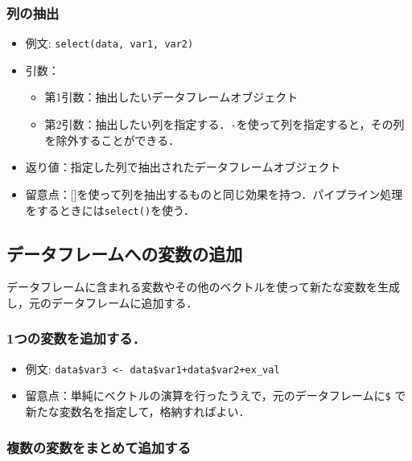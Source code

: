 \documentclass[
  xelatex, ja=standard]{bxjsarticle}
\providecommand{\tightlist}{%
  \setlength{\itemsep}{0pt}\setlength{\parskip}{0pt}}
\begin{document}
\subsubsection{列の抽出}\label{ux5217ux306eux62bdux51fa}

\begin{itemize}
\tightlist
\item
  例文: \texttt{select(data,\ var1,\ var2)}
\item
  引数：

  \begin{itemize}
  \tightlist
  \item
    第1引数：抽出したいデータフレームオブジェクト
  \item
    第2引数：抽出したい列を指定する．\texttt{-}を使って列を指定すると，その列を除外することができる．
  \end{itemize}
\item
  返り値：指定した列で抽出されたデータフレームオブジェクト
\item
  留意点：{[}{]}を使って列を抽出するものと同じ効果を持つ．パイプライン処理をするときには\texttt{select()}を使う．
\end{itemize}

\subsection{データフレームへの変数の追加}\label{ux30c7ux30fcux30bfux30d5ux30ecux30fcux30e0ux3078ux306eux5909ux6570ux306eux8ffdux52a0}

データフレームに含まれる変数やその他のベクトルを使って新たな変数を生成し，元のデータフレームに追加する．

\subsubsection{1つの変数を追加する．}\label{ux3064ux306eux5909ux6570ux3092ux8ffdux52a0ux3059ux308b}

\begin{itemize}
\tightlist
\item
  例文: \texttt{data\$var3\ \textless{}-\ data\$var1+data\$var2+ex\_val}
\item
  留意点：単純にベクトルの演算を行ったうえで，元のデータフレームに\texttt{\$}
  で新たな変数名を指定して，格納すればよい．
\end{itemize}

\subsubsection{複数の変数をまとめて追加する}\label{ux8907ux6570ux306eux5909ux6570ux3092ux307eux3068ux3081ux3066ux8ffdux52a0ux3059ux308b}
\end{document}
